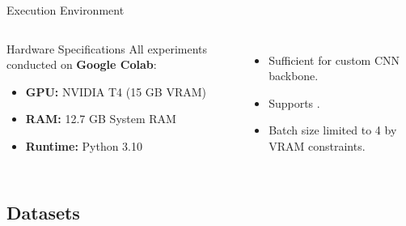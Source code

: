 \begin{frame}{Execution Environment}
    \begin{columns}[T]
        \begin{block}{Hardware Specifications}
            All experiments conducted on \textbf{Google Colab}:
            \begin{itemize}
                \item \textbf{GPU:} NVIDIA T4 (15 GB VRAM)
                \item \textbf{RAM:} 12.7 GB System RAM
                \item \textbf{Runtime:} Python 3.10
            \end{itemize}
        \end{block}

        \begin{itemize}
            \item Sufficient for custom CNN backbone.
            \item Supports .
            \item Batch size limited to 4 by VRAM constraints.
        \end{itemize}
    \end{columns}
\end{frame}

\subsection{Datasets}

